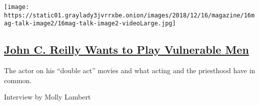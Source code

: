 \begin{enumerate}
  \texttt{[image: https://static01.graylady3jvrrxbe.onion/images/2018/12/16/magazine/16mag-talk-image2/16mag-talk-image2-videoLarge.jpg]}

  \hypertarget{john-c-reilly-wants-to-play-vulnerable-men}{%
  \subsection{\texorpdfstring{\href{/2018/12/13/magazine/john-c-reilly-wants-to-play-vulnerable-men.html}{John
  C. Reilly Wants to Play Vulnerable
  Men}}{John C. Reilly Wants to Play Vulnerable Men}}\label{john-c-reilly-wants-to-play-vulnerable-men}}

  The actor on his ``double act'' movies and what acting and the
  priesthood have in common.

  Interview by Molly Lambert
\end{enumerate}

